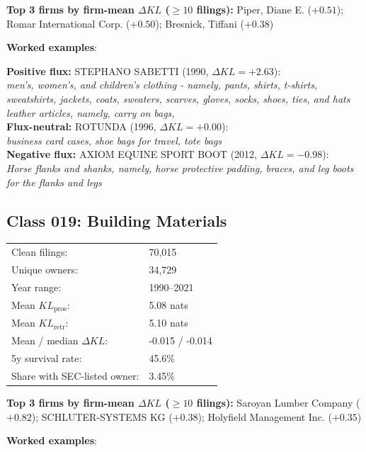 \textbf{Top 3 firms by firm-mean $\Delta KL$ ($\geq 10$ filings):} Piper, Diane E. ($+0.51$); Romar International Corp. ($+0.50$); Bresnick, Tiffani ($+0.38$)

\textbf{Worked examples}:

  \textbf{Positive flux:} \textsc{STEPHANO SABETTI} (1990, $\Delta KL=+2.63$):\\
  \textit{men's, women's, and children's clothing - namely, pants, shirts, t-shirts, sweatshirts, jackets, coats, sweaters, scarves, gloves, socks, shoes, ties, and hats leather articles, namely, carry on bags,}\\
  \textbf{Flux-neutral:} \textsc{ROTUNDA} (1996, $\Delta KL=+0.00$):\\
  \textit{business card cases, shoe bags for travel, tote bags}\\
  \textbf{Negative flux:} \textsc{AXIOM EQUINE SPORT BOOT} (2012, $\Delta KL=-0.98$):\\
  \textit{Horse flanks and shanks, namely, horse protective padding, braces, and leg boots for the flanks and legs}\\

\subsection*{Class 019: Building Materials}
\label{app:industry-019}

\begin{tabular}{ll}
Clean filings: & 70,015 \\
Unique owners: & 34,729 \\
Year range: & 1990--2021 \\
Mean $KL_\text{pros}$: & 5.08 nats \\
Mean $KL_\text{retr}$: & 5.10 nats \\
Mean / median $\Delta KL$: & -0.015 / -0.014 \\
5y survival rate: & 45.6\% \\
Share with SEC-listed owner: & 3.45\% \\
\end{tabular}

\textbf{Top 3 firms by firm-mean $\Delta KL$ ($\geq 10$ filings):} Saroyan Lumber Company ($+0.82$); SCHLUTER-SYSTEMS KG ($+0.38$); Holyfield Management Inc. ($+0.35$)

\textbf{Worked examples}:

